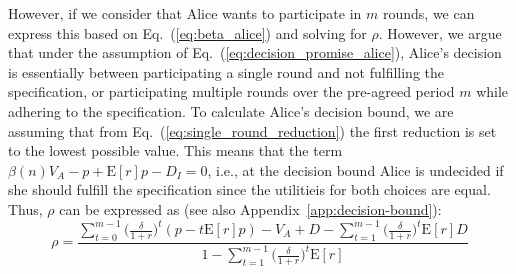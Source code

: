 \documentclass[runningheads]{llncs}
\newcommand{\sys}{Promise\xspace}
\begin{document}
However, if we consider that Alice wants to participate in $m$ rounds, we can express this based on Eq.~(\ref{eq:beta_alice}) and solving for $\rho$.
However, we argue that under the assumption of Eq.~(\ref{eq:decision_promise_alice}), Alice's decision is essentially between participating a single round and not fulfilling the specification, or participating multiple rounds over the pre-agreed period $m$ while adhering to the specification.
To calculate Alice's decision bound, we are assuming that from Eq.~(\ref{eq:single_round_reduction}) the first reduction is set to the lowest possible value.
This means that the term $\beta(n)V_A - p + \mathrm{E}[r]p - D_I = 0$, i.e., at the decision bound Alice is undecided if she should fulfill the specification since the utilitieis for both choices are equal.
Thus, $\rho$ can be expressed as (see also Appendix~\ref{app:decision-bound}):
\begin{equation}
    \label{eq:multi_round_reduction}
    \rho =  \frac{\sum_{t=0}^{m-1} \big( \frac{\delta}{1+r} \big)^{t} ( p - t\mathrm{E}[r]p)  - V_A + D - \sum_{t=1}^{m-1} \big( \frac{\delta}{1+r} \big)^{t} \mathrm{E}[r]D}{1 - \sum_{t=1}^{m-1} \big( \frac{\delta}{1+r} \big)^{t} \mathrm{E}[r]}
\end{equation}





\end{document}
